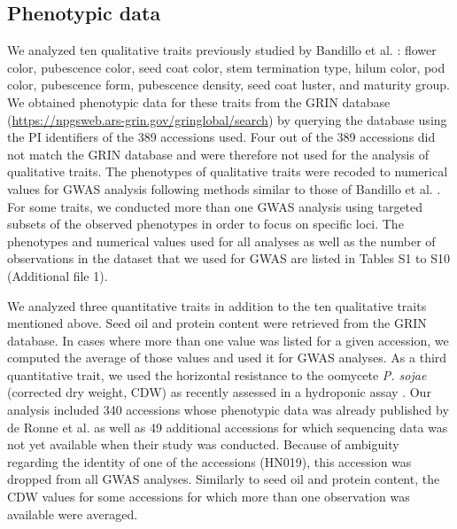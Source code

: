 \documentclass{article}
\begin{document}
\subsection*{Phenotypic data}

We analyzed ten qualitative traits previously studied by Bandillo et al. \cite{bandillo2017}: flower
color, pubescence color, seed coat color, stem termination type, hilum color,
pod color, pubescence form, pubescence density, seed coat luster, and maturity
group.  We obtained phenotypic data for these traits from the GRIN database
(\url{https://npgsweb.ars-grin.gov/gringlobal/search}) by querying the database
using the PI identifiers of the 389 accessions used.  Four out of the 389
accessions did not match the GRIN database and were therefore not used for the
analysis of qualitative traits. The phenotypes of qualitative traits were recoded
to numerical values for GWAS analysis following methods similar to those of
Bandillo et al. \cite{bandillo2017}.  For some traits, we conducted more than one GWAS analysis
using targeted subsets of the observed phenotypes in order to focus on specific
loci. The phenotypes and numerical values used for all analyses as well as the
number of observations in the dataset that we used for GWAS are listed in
Tables S1 to S10 (Additional file 1).

We analyzed three quantitative traits in addition to the ten qualitative traits
mentioned above. Seed oil and protein content were retrieved from the GRIN
database. In cases where more than one value was listed for a given accession,
we computed the average of those values and used it for GWAS analyses. As a third quantitative trait, we
used the horizontal resistance to the oomycete \textit{P. sojae} (corrected dry
weight, CDW) as recently assessed in a hydroponic assay \citep{deronne2022}.
Our analysis included 340 accessions whose phenotypic data
was already published by de Ronne et al. \cite{deronne2022} as well as 49 additional accessions for
which sequencing data was not yet available when their study was conducted.
Because of ambiguity regarding the identity of one of the accessions (HN019), this accession
was dropped from all GWAS analyses. Similarly to seed oil and
protein content, the CDW values for some accessions for which more than one
observation was available were averaged.
\end{document}

